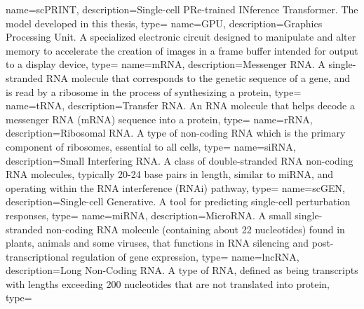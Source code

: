 {
    name={scPRINT},
    description={Single-cell PRe-trained INference Transformer. The model developed in this thesis},
    type=\acronymtype
}
{
    name={GPU},
    description={Graphics Processing Unit. A specialized electronic circuit designed to manipulate and alter memory to accelerate the creation of images in a frame buffer intended for output to a display device},
    type=\acronymtype
}
{
    name={mRNA},
    description={Messenger RNA. A single-stranded RNA molecule that corresponds to the genetic sequence of a gene, and is read by a ribosome in the process of synthesizing a protein},
    type=\acronymtype
}
{
    name={tRNA},
    description={Transfer RNA. An RNA molecule that helps decode a messenger RNA (mRNA) sequence into a protein},
    type=\acronymtype
}
{
    name={rRNA},
    description={Ribosomal RNA. A type of non-coding RNA which is the primary component of ribosomes, essential to all cells},
    type=\acronymtype
}
{
    name={siRNA},
    description={Small Interfering RNA. A class of double-stranded RNA non-coding RNA molecules, typically 20-24 base pairs in length, similar to miRNA, and operating within the RNA interference (RNAi) pathway},
    type=\acronymtype
}
{
    name={scGEN},
    description={Single-cell Generative. A tool for predicting single-cell perturbation responses},
    type=\acronymtype
}
{
    name={miRNA},
    description={MicroRNA. A small single-stranded non-coding RNA molecule (containing about 22 nucleotides) found in plants, animals and some viruses, that functions in RNA silencing and post-transcriptional regulation of gene expression},
    type=\acronymtype
}
{
    name={lncRNA},
    description={Long Non-Coding RNA. A type of RNA, defined as being transcripts with lengths exceeding 200 nucleotides that are not translated into protein},
    type=\acronymtype
}

